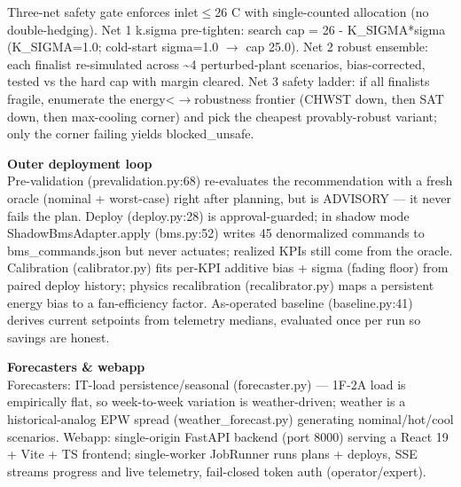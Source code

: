 \documentclass[10pt]{article}
\begin{document}
Three-net safety gate enforces inlet$\leq$26 C with single-counted allocation (no double-hedging). Net 1 k.sigma pre-tighten: search cap = 26 - K\_\allowbreak{}SIGMA*sigma (K\_\allowbreak{}SIGMA=1.0; cold-start sigma=1.0 $\rightarrow$ cap 25.0). Net 2 robust ensemble: each finalist re-simulated across \textasciitilde{}4 perturbed-plant scenarios, bias-corrected, tested vs the hard cap with margin cleared. Net 3 safety ladder: if all finalists fragile, enumerate the energy<$\rightarrow$robustness frontier (CHWST down, then SAT down, then max-cooling corner) and pick the cheapest provably-robust variant; only the corner failing yields blocked\_\allowbreak{}unsafe.

\smallskip\noindent\textbf{Outer deployment loop}\\[1pt]
Pre-validation (prevalidation.py:68) re-evaluates the recommendation with a fresh oracle (nominal + worst-case) right after planning, but is ADVISORY — it never fails the plan. Deploy (deploy.py:28) is approval-guarded; in shadow mode ShadowBmsAdapter.apply (bms.py:52) writes 45 denormalized commands to bms\_\allowbreak{}commands.json but never actuates; realized KPIs still come from the oracle. Calibration (calibrator.py) fits per-KPI additive bias + sigma (fading floor) from paired deploy history; physics recalibration (recalibrator.py) maps a persistent energy bias to a fan-efficiency factor. As-operated baseline (baseline.py:41) derives current setpoints from telemetry medians, evaluated once per run so savings are honest.

\smallskip\noindent\textbf{Forecasters \& webapp}\\[1pt]
Forecasters: IT-load persistence/\allowbreak{}seasonal (forecaster.py) — 1F-2A load is empirically flat, so week-to-week variation is weather-driven; weather is a historical-analog EPW spread (weather\_\allowbreak{}forecast.py) generating nominal/\allowbreak{}hot/\allowbreak{}cool scenarios. Webapp: single-origin FastAPI backend (port 8000) serving a React 19 + Vite + TS frontend; single-worker JobRunner runs plans + deploys, SSE streams progress and live telemetry, fail-closed token auth (operator/\allowbreak{}expert).
\end{document}
